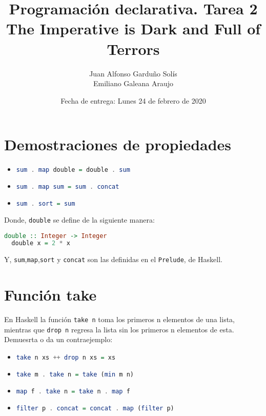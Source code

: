 \documentclass[spanish,12pt,letterpaper]{article}
\title{Programación declarativa. Tarea 2\\
\Huge{The Imperative is Dark and Full of Terrors}}
\author{Juan Alfonso Garduño Solís\\
  Emiliano Galeana Araujo}
\affil{Facultad de ciencias, UNAM}
\date{Fecha de entrega: Lunes 24 de febrero de 2020}
\begin{document}
\maketitle

\section{Demostraciones de propiedades}
\begin{itemize}
\item
  \begin{lstlisting}[language=Haskell]
    sum . map double = double . sum
  \end{lstlisting}
  
\item
  \begin{lstlisting}[language=Haskell]
    sum . map sum = sum . concat
  \end{lstlisting}
  
\item
  \begin{lstlisting}[language=Haskell]
    sum . sort = sum
  \end{lstlisting}
\end{itemize}
Donde, \texttt{double} se define de la siguiente manera:
\begin{lstlisting}[language=Haskell]
  double :: Integer -> Integer
  double x = 2 * x
\end{lstlisting}
Y, \texttt{sum},\texttt{map},\texttt{sort} y \texttt{concat} son las definidas en
el \texttt{Prelude}, de Haskell.

\section{Función take}
En Haskell la función \texttt{take n} toma los primeros n elementos de una lista,
mientras que \texttt{drop n} regresa la lista sin los primeros n elementos de
esta. Demuesrta o da un contraejemplo:
\begin{itemize}
\item
  \begin{lstlisting}[language=Haskell]
    take n xs ++ drop n xs = xs
  \end{lstlisting}

\item
  \begin{lstlisting}[language=Haskell]
    take m . take n = take (min m n)
  \end{lstlisting}
  
\item
  \begin{lstlisting}[language=Haskell]
    map f . take n = take n . map f
  \end{lstlisting}
  
\item
  \begin{lstlisting}[language=Haskell]
    filter p . concat = concat . map (filter p)
  \end{lstlisting}
\end{itemize}
\end{document}
